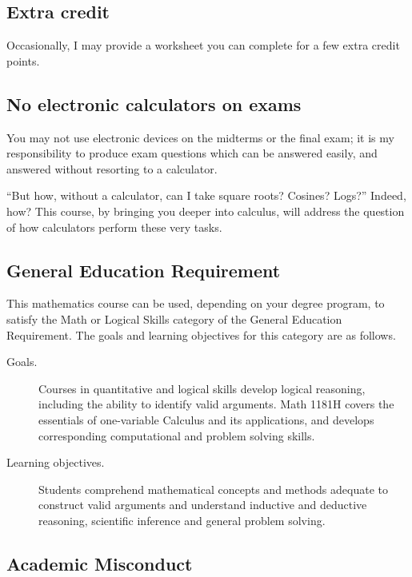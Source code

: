 \documentclass[12pt]{handout}
\begin{document}
\vspace{1ex}

\subsection*{Extra credit}

\noindent Occasionally, I may provide a worksheet you can complete for a few extra credit points.

\subsection*{No electronic calculators on exams}

You may not use electronic devices on the midterms or the final exam;
it is my responsibility to produce exam questions which can be
answered easily, and answered without resorting to a calculator.

``But how, without a calculator, can I take square roots?  Cosines?
Logs?''  Indeed, how?  This course, by bringing you deeper into
calculus, will address the question of how calculators perform these
very tasks.

\subsection*{General Education Requirement}

This mathematics course can be used, depending on your degree program, to satisfy the Math or Logical Skills category of the General Education Requirement. The goals and learning objectives for this category are as follows.
\begin{description}
\item[Goals.] Courses in quantitative and logical skills develop logical reasoning, including the ability to identify valid arguments. Math 1181H covers the essentials of one-variable Calculus and its applications, and develops corresponding computational  and problem solving skills. 	
\item[Learning objectives.] Students comprehend mathematical concepts and methods adequate to construct valid arguments and understand inductive and deductive reasoning, scientific inference and general problem solving.
\end{description}

\subsection*{Academic Misconduct}
\end{document}
